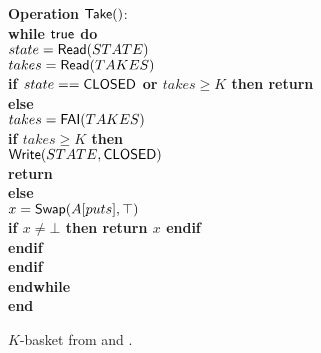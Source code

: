\begin{figure}
{{\begin{minipage}[t]{180mm}
\begin{tabbing}
{\bf Operation} ${\sf \small Take}()$: \\
 \> {\bf while \({\sf \small true}\) do}\\
 \> \> \(state = {\sf \small Read}(STATE)\) \\
 \> \> \(takes = {\sf \small Read}(TAKES)\) \\
 \> \> {\bf if \(state == {\sf \small CLOSED}\) or \(takes \geq K\) then return \closed} \\
 \> \> {\bf else} \\
 \> \> \> \(takes = {\sf \small FAI}(TAKES)\) \\
 \> \> \> {\bf if \(takes \geq K\) then} \\
 \> \> \> \> \({\sf \small Write}(STATE, {\sf \small CLOSED})\) \\
 \> \> \> \> \textbf{return} \closed \\
 \> \> \> {\bf else} \\
 \> \> \> \> \(x = {\sf \small Swap}(A[puts], \top)\) \\
 \> \> \> \> {\bf if \(x \neq \bot\) then return \(x\) endif} \\
 \> \> \> {\bf endif} \\
 \> \> {\bf endif} \\
 \> {\bf endwhile}\\
{\bf end \Take}
\end{tabbing}
\end{minipage}}
\caption{\label{basket-1}$K$-basket from \FAI and \SWAP.}
}
\end{figure}

